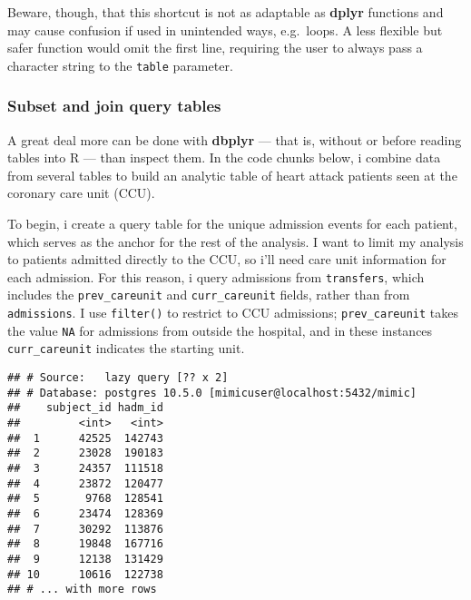 \documentclass[]{article}
\newenvironment{Shaded}{\begin{snugshade}}{\end{snugshade}}
\newcommand{\KeywordTok}[1]{\textcolor[rgb]{0.13,0.29,0.53}{\textbf{#1}}}
\newcommand{\StringTok}[1]{\textcolor[rgb]{0.31,0.60,0.02}{#1}}
\newcommand{\OperatorTok}[1]{\textcolor[rgb]{0.81,0.36,0.00}{\textbf{#1}}}
\newcommand{\NormalTok}[1]{#1}
\begin{document}
Beware, though, that this shortcut is not as adaptable as \textbf{dplyr}
functions and may cause confusion if used in unintended ways,
e.g.~loops. A less flexible but safer function would omit the first
line, requiring the user to always pass a character string to the
\texttt{table} parameter.

\subsubsection{Subset and join query
tables}\label{subset-and-join-query-tables}

A great deal more can be done with \textbf{dbplyr} --- that is, without
or before reading tables into R --- than inspect them. In the code
chunks below, i combine data from several tables to build an analytic
table of heart attack patients seen at the coronary care unit (CCU).

To begin, i create a query table for the unique admission events for
each patient, which serves as the anchor for the rest of the analysis. I
want to limit my analysis to patients admitted directly to the CCU, so
i'll need care unit information for each admission. For this reason, i
query admissions from \texttt{transfers}, which includes the
\texttt{prev\_careunit} and \texttt{curr\_careunit} fields, rather than
from \texttt{admissions}. I use \texttt{filter()} to restrict to CCU
admissions; \texttt{prev\_careunit} takes the value \texttt{NA} for
admissions from outside the hospital, and in these instances
\texttt{curr\_careunit} indicates the starting unit.

\begin{Shaded}
\end{Shaded}

\begin{verbatim}
## # Source:   lazy query [?? x 2]
## # Database: postgres 10.5.0 [mimicuser@localhost:5432/mimic]
##    subject_id hadm_id
##         <int>   <int>
##  1      42525  142743
##  2      23028  190183
##  3      24357  111518
##  4      23872  120477
##  5       9768  128541
##  6      23474  128369
##  7      30292  113876
##  8      19848  167716
##  9      12138  131429
## 10      10616  122738
## # ... with more rows
\end{verbatim}
\end{document}
